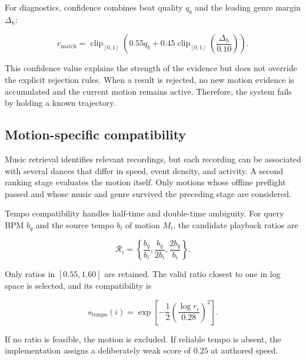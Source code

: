 For diagnostics, confidence combines beat quality $q_b$ and the leading genre
margin $\Delta_h$:

\begin{equation}
    c_{\mathrm{match}}
    =\operatorname{clip}_{[0,1]}\!\left(
       0.55q_b+0.45\operatorname{clip}_{[0,1]}
       \left(\frac{\Delta_h}{0.10}\right)
      \right).
    \label{eq:ch5_match_confidence}
\end{equation}

This confidence value explains the strength of the evidence but does not
override the explicit rejection rules. When a result is rejected, no new
motion evidence is accumulated and the current motion remains active. Therefore, the
system fails by holding a known trajectory.

\subsection{Motion-specific compatibility}
\label{subsec:ch5_motion_compatibility}

Music retrieval identifies relevant recordings, but each recording can be
associated with several dances that differ in speed, event density, and
activity. A second ranking stage evaluates the motion itself. Only motions
whose offline preflight passed and whose music and genre survived the preceding
stage are considered.

Tempo compatibility handles half-time and double-time ambiguity. For query BPM
$b_q$ and the source tempo $b_i$ of motion $M_i$, the candidate playback ratios
are

\begin{equation}
    \mathcal{R}_i=
    \left\{\frac{b_q}{b_i},\frac{b_q}{2b_i},
                  \frac{2b_q}{b_i}\right\}.
    \label{eq:ch5_tempo_ratios}
\end{equation}

Only ratios in $[0.55,1.60]$ are retained. The valid ratio closest to one in
log space is selected, and its compatibility is

\begin{equation}
    s_{\mathrm{tempo}}(i)
    =\exp\!\left[-\frac{1}{2}
      \left(\frac{\log r_i}{0.28}\right)^2\right].
    \label{eq:ch5_tempo_score}
\end{equation}

If no ratio is feasible, the motion is excluded. If reliable tempo is absent,
the implementation assigns a deliberately weak score of $0.25$ at authored
speed.

